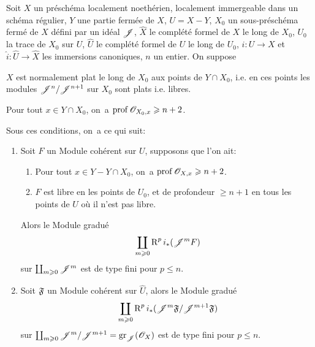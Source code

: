 \begin{theoreme} \label{XII.4.1} Soit $X$ un pr\'esch\'ema localement noeth\'erien, localement immergeable dans un sch\'ema r\'egulier, $Y$ une partie ferm\'ee de $X$, $U=X- Y$, $X_0$ un sous-pr\'esch\'ema ferm\'e de $X$ d\'efini par un id\'eal ${\mathscr J}$, $\widehat{X}$ le compl\'et\'e formel de $X$ le long de $X_0$, $U_0$ la trace de $X_0$ sur $U$, $\widehat{U}$ le compl\'et\'e formel de $U$ le long de $U_0$, $i:U\to X$ et $\widehat{i}:\widehat{U}\to \widehat{X}$ les immersions canoniques, $n$ un entier. On suppose
\begin{enumeratea}
\item
$X$ est normalement plat le long de $X_0$ aux points de $Y\cap X_0$, i.e. en ces points les modules ${\mathscr J}^n/{\mathscr J}^{n+1}$ sur $X_0$ sont plats i.e. \ignorespaces libres.
\item
Pour tout $x\in Y\cap X_0$, on~a $\operatorname{prof} {\mathscr O}_{X_0, x}\geqslant n+2$.
\end{enumeratea}
Sous ces conditions, on~a ce qui suit:
\begin{enumerate}
\item[$1^\circ)$] Soit $F$ un Module coh\'erent sur $U$, supposons que l'on ait:
\begin{enumerate}
\item[\textup{c)}] Pour tout $x\in Y- Y\cap X_0$, on~a $\operatorname{prof} {\mathscr O}_{X, x}\geqslant n+2$.

\item[\textup{d)}] $F$ est libre en les points de $U_0$, et de profondeur $\geq n+1$ en tous les points de $U$ o\`u il n'est pas libre.
\end{enumerate}
Alors le Module gradu\'e
\[
\coprod_{m\geqslant 0}\operatorname{R}^pi_\ast({\mathscr J}^mF)
\]
sur $\coprod_{m\geqslant 0}{\mathscr J}^m$ est de type fini pour $p\leq n$. \item[$2^\circ$] Soit $\mathfrak{F}$ un Module coh\'erent sur $\widehat{U}$, alors le Module gradu\'e
\[
\coprod_{m\geqslant 0}\operatorname{R}^pi_\ast({\mathscr J}^m\mathfrak{F}/{\mathscr J}^{m+1}\mathfrak{F})
\]
sur $\coprod_{m\geqslant 0}{\mathscr J}^m/{\mathscr J}^{m+1}=\operatorname{gr}_{{\mathscr J}}(\mathscr{O}_X)$ est de type fini pour $p\leq n$.
\end{enumerate}
\end{theoreme}

